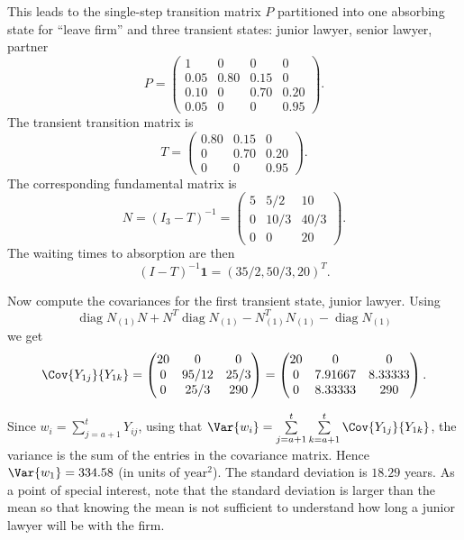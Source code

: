 \documentclass[12pt]{article}
\begin{document}
  \begin{solution}
This leads to the single-step transition matrix \( P \) partitioned into
one absorbing state for ``leave firm'' and three transient
states: junior lawyer, senior lawyer, partner
\[
    P =
    \begin{pmatrix}
        1    & 0    & 0    & 0    \\
        0.05 & 0.80 & 0.15 & 0    \\
        0.10 & 0    & 0.70 & 0.20 \\
        0.05 & 0    & 0    & 0.95
    \end{pmatrix}.
\] The transient transition matrix is
\[
    T = 
    \begin{pmatrix}
         0.80 & 0.15 & 0 \\
               0 & 0.70 & 0.20 \\
               0 &    0 & 0.95
    \end{pmatrix}.
\] The corresponding fundamental matrix is
\[
    N= (I_3 - T)^{-1} =
    \begin{pmatrix}
        5 & 5/2 & 10 \\
        0 & 10/3 & 40/3 \\
        0 & 0 & 20
    \end{pmatrix}.
\] The waiting times to absorption are then
\[
    (I-T)^{-1} \mathbf{1} = (35/2, 50/3, 20)^{T}.
\]

Now compute the covariances for the first transient state, junior
lawyer.  Using
\[
    \operatorname{diag}
    {N_{(1)}} N + N^T
    \operatorname{diag}
    {N_{(1)}} - N_{(1)}^T N_{(1)} -
    \operatorname{diag}
    N_{(1)}
\] we get
\[
    \Cov{Y_{1j}}{Y_{1k}} =
    \begin{pmatrix}
        20 & 0 & 0 \\
        0 & 95/12 & 25/3 \\
        0 & 25/3 & 290
    \end{pmatrix}
    =
    \begin{pmatrix}
        20 & 0 & 0 \\
        0 & 7.91667 & 8.33333 \\
        0 & 8.33333 & 290
    \end{pmatrix}.
\]

Since \( w_i = \sum\limits_{j=a+1}^{t} Y_{ij} \), using that \( \Var{w_i}
= \sum\limits_{j=a+1}^t \sum\limits_{k=a+1}^t \Cov{Y_{1j}}{Y_{1k}} \),
the variance is the sum of the entries in the covariance matrix. Hence \(
\Var{w_1} = 334.58 \) (in units of \( \text{year}^2 \)).  The standard
deviation is \( 18.29 \) years.  As a point of special interest, note that the
standard deviation is larger than the mean so that knowing the mean is
not sufficient to understand how long a junior lawyer will be with the firm.
\end{solution}
\end{document}
